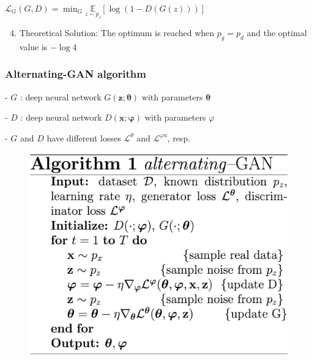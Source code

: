 
$
\mathscr{L}_{G}(G, D) =\min _{G} \underset{z \sim p_{z}}{\mathbb{E}}[\log (1-D(G(z)))]
$

\begin{enumerate}
  \setcounter{enumi}{3}
  \item Theoretical Solution: The optimum is reached when $p_{g}=p_{d}$ and the optimal value is $-\log 4$
\end{enumerate}

\subsubsection*{Alternating-GAN algorithm}


- $G$ : deep neural network $G(\mathbf{z} ; \boldsymbol{\theta})$ with parameters $\boldsymbol{\theta}$

- $D$ : deep neural network $D(\mathbf{x} ; \boldsymbol{\varphi})$ with parameters $\varphi$

- $G$ and $D$ have different losses $\mathcal{L}^{\theta}$ and $\mathcal{L}^{\varphi a}$, resp.


\begin{figure} 
  \centering
  \includegraphics*[width=0.5\columnwidth]{figures/generative_alter_GAN.png}
\end{figure}




